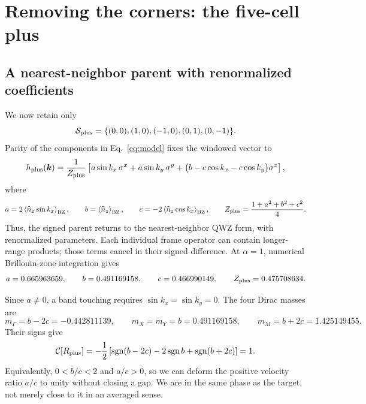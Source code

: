 \documentclass[aps,prb,onecolumn,nofootinbib,superscriptaddress]{revtex4-2}
\newcommand{\bk}{\boldsymbol{k}}
\newcommand{\BZ}{\mathrm{BZ}}
\newcommand{\Chern}{\mathcal{C}}
\newcommand{\avg}[1]{\left\langle #1\right\rangle_{\BZ}}
\DeclareMathOperator{\sgn}{sgn}
\begin{document}
\section{Removing the corners: the five-cell plus}

\subsection{A nearest-neighbor parent with renormalized coefficients}

We now retain only
\begin{equation}
 \mathcal S_{\rm plus}=\{(0,0),(1,0),(-1,0),(0,1),(0,-1)\}.
\end{equation}
Parity of the components in Eq.~\eqref{eq:model} fixes the windowed vector to
\begin{equation}
 h_{\rm plus}(\bk)=\frac{1}{Z_{\rm plus}}
 \left[a\sin k_x\,\sigma^x+a\sin k_y\,\sigma^y+
 \bigl(b-c\cos k_x-c\cos k_y\bigr)\sigma^z\right],
 \label{eq:plus}
\end{equation}
where
\begin{equation}
 a=2\avg{\widehat n_x\sin k_x},\qquad
 b=\avg{\widehat n_z},\qquad
 c=-2\avg{\widehat n_z\cos k_x},\qquad
 Z_{\rm plus}=\frac{1+a^2+b^2+c^2}{4}.
 \label{eq:abc}
\end{equation}
Thus, the signed parent returns to the nearest-neighbor QWZ form, with renormalized parameters. Each individual frame operator can contain longer-range products; those terms cancel in their signed difference. At $\alpha=1$, numerical Brillouin-zone integration gives
\begin{equation}
 a=0.665963659,\qquad b=0.491169158,\qquad c=0.466990149,
 \qquad Z_{\rm plus}=0.475708634.
 \label{eq:abcvalues}
\end{equation}

Since $a\ne0$, a band touching requires $\sin k_x=\sin k_y=0$. The four Dirac masses are
\begin{equation}
 m_\Gamma=b-2c=-0.442811139,\qquad
 m_X=m_Y=b=0.491169158,\qquad
 m_M=b+2c=1.425149455.
 \label{eq:masses}
\end{equation}
Their signs give
\begin{equation}
 \Chern[R_{\rm plus}]=-\frac12\left[\sgn(b-2c)-2\sgn b+\sgn(b+2c)\right]=1.
 \label{eq:diracchern}
\end{equation}
Equivalently, $0<b/c<2$ and $a/c>0$, so we can deform the positive velocity ratio $a/c$ to unity without closing a gap. We are in the same phase as the target, not merely close to it in an averaged sense.
\end{document}
